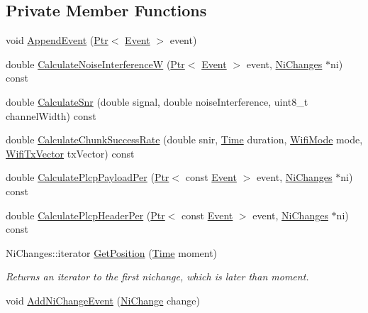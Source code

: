 \subsection*{Private Member Functions}
\begin{DoxyCompactItemize}
\item 
void \hyperlink{classns3_1_1InterferenceHelper_a2a316633728f72317cdbc816dba6a75a}{Append\+Event} (\hyperlink{classns3_1_1Ptr}{Ptr}$<$ \hyperlink{classns3_1_1InterferenceHelper_1_1Event}{Event} $>$ event)
\item 
double \hyperlink{classns3_1_1InterferenceHelper_a7a12e0100c3d9b7b969055dc8a9749eb}{Calculate\+Noise\+InterferenceW} (\hyperlink{classns3_1_1Ptr}{Ptr}$<$ \hyperlink{classns3_1_1InterferenceHelper_1_1Event}{Event} $>$ event, \hyperlink{classns3_1_1InterferenceHelper_ac32f50ca00a8e76bb133230d27cce2a9}{Ni\+Changes} $\ast$ni) const 
\item 
double \hyperlink{classns3_1_1InterferenceHelper_a8f6192d041874595004c007c5a519b4b}{Calculate\+Snr} (double signal, double noise\+Interference, uint8\+\_\+t channel\+Width) const 
\item 
double \hyperlink{classns3_1_1InterferenceHelper_ab1c34c3f7ecef1e37ec778c0cf0e9cef}{Calculate\+Chunk\+Success\+Rate} (double snir, \hyperlink{classns3_1_1Time}{Time} duration, \hyperlink{classns3_1_1WifiMode}{Wifi\+Mode} mode, \hyperlink{classns3_1_1WifiTxVector}{Wifi\+Tx\+Vector} tx\+Vector) const 
\item 
double \hyperlink{classns3_1_1InterferenceHelper_a8c9317f11b949c942c17f6e27d2fce4e}{Calculate\+Plcp\+Payload\+Per} (\hyperlink{classns3_1_1Ptr}{Ptr}$<$ const \hyperlink{classns3_1_1InterferenceHelper_1_1Event}{Event} $>$ event, \hyperlink{classns3_1_1InterferenceHelper_ac32f50ca00a8e76bb133230d27cce2a9}{Ni\+Changes} $\ast$ni) const 
\item 
double \hyperlink{classns3_1_1InterferenceHelper_aaf79774a485686115168f807305d3479}{Calculate\+Plcp\+Header\+Per} (\hyperlink{classns3_1_1Ptr}{Ptr}$<$ const \hyperlink{classns3_1_1InterferenceHelper_1_1Event}{Event} $>$ event, \hyperlink{classns3_1_1InterferenceHelper_ac32f50ca00a8e76bb133230d27cce2a9}{Ni\+Changes} $\ast$ni) const 
\item 
Ni\+Changes\+::iterator \hyperlink{classns3_1_1InterferenceHelper_aacb34f10699da1566ef896bc09f0f6c1}{Get\+Position} (\hyperlink{classns3_1_1Time}{Time} moment)
\begin{DoxyCompactList}\small\item\em Returns an iterator to the first nichange, which is later than moment. \end{DoxyCompactList}\item 
void \hyperlink{classns3_1_1InterferenceHelper_a4e97729008bc32205eaa2132addf108b}{Add\+Ni\+Change\+Event} (\hyperlink{classns3_1_1InterferenceHelper_1_1NiChange}{Ni\+Change} change)
\end{DoxyCompactItemize}
